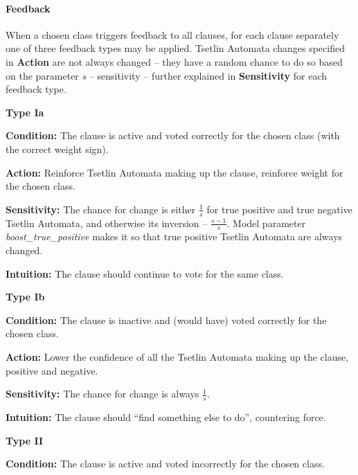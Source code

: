\paragraph{Feedback}\label{feedback-dense}
When a chosen class triggers feedback to all clauses, for each clause separately one of three feedback types may be applied. 
Tsetlin Automata changes specified in \textbf{Action} are not always changed -- they have a random chance to do so based on the parameter \textit{s} -- sensitivity -- further explained in \textbf{Sensitivity} for each feedback type.
\begin{compactitem}
\item \textbf{Type Ia}
    \begin{compactitem}
        \item \textbf{Condition:} The clause is active and voted correctly for the chosen class (with the correct weight sign).
        \item \textbf{Action:} Reinforce Tsetlin Automata making up the clause, reinforce weight for the chosen class.
        \item \textbf{Sensitivity:} The chance for change is either $\frac{1}{s}$ for true positive and true negative Tsetlin Automata, and otherwise its inversion -- $\frac{s - 1}{s}$. Model parameter \textit{boost\-\_true\-\_positive} makes it so that true positive Tsetlin Automata are always changed.
        \item \textbf{Intuition:} The clause should continue to vote for the same class.
    \end{compactitem}
\item \textbf{Type Ib}
    \begin{compactitem}
        \item \textbf{Condition:} The clause is inactive and (would have) voted correctly for the chosen class.
        \item \textbf{Action:} Lower the confidence of all the Tsetlin Automata making up the clause, positive and negative.
        \item \textbf{Sensitivity:} The chance for change is always $\frac{1}{s}$.
        \item \textbf{Intuition:} The clause should ``find something else to do'', countering force.
    \end{compactitem}
\item \textbf{Type II}
    \begin{compactitem}
        \item \textbf{Condition:} The clause is active and voted incorrectly for the chosen class.

\end{compactitem}
\end{compactitem}
